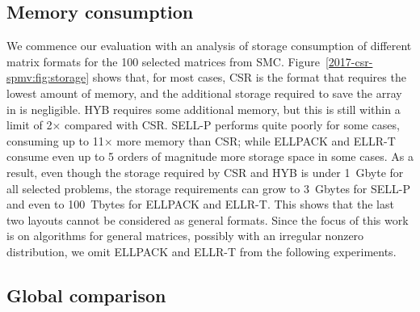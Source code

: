 \subsection{Memory consumption}

We commence our evaluation with an analysis of storage consumption
of different matrix formats for the 100 selected matrices from SMC.
Figure~\ref{2017-csr-spmv:fig:storage} shows that,
for most cases, CSR is the format that requires the lowest amount of memory,
and the additional storage required to save the \srow array in \bcsr
is negligible.
HYB requires some additional memory,
but this is still within a limit
of 2$\times$ compared with CSR.
SELL-P performs quite poorly for some cases,
consuming up to 11$\times$ more memory than CSR;
while ELLPACK and ELLR-T consume even up to 5 orders of magnitude more
storage space in some cases.
As a result, even though the storage required by CSR and HYB is under 1~Gbyte
for all selected problems, the storage requirements can grow to 3~Gbytes for SELL-P
and even to 100~Tbytes for ELLPACK and ELLR-T.
This shows that the last two layouts cannot be considered as general formats.
Since the focus of this work is on \spmv algorithms
for general matrices,
possibly with an irregular nonzero distribution,
we omit ELLPACK and ELLR-T from the following experiments.

\subsection{Global comparison}

